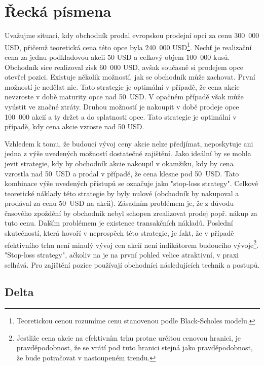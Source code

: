 \documentclass[a4paper]{book}
\begin{document}
\chapter{Řecká písmena}

Uvažujme situaci, kdy obchodník prodal evropskou prodejní opci za cenu 300~000 USD, přičemž teoretická cena této opce byla 240~000 USD\footnote{Teoretickou cenou rozumíme cenu stanovenou podle Black-Scholes modelu.}. Nechť je realizační cena za jednu podkladovou akcii 50 USD a celkový objem 100~000 kusů.
Obchodník sice realizoval zisk 60~000 USD, avšak současně si prodejem opce otevřel pozici.  Existuje několik možností, jak se obchodník může zachovat. První možností je nedělat nic. Tato strategie je optimální v případě, že cena akcie nevzroste v době maturity opce nad 50~USD. V opačném případě však může vyústit ve značné ztráty. Druhou možností je nakoupit v době prodeje opce 100~000 akcií a ty držet a do splatnosti opce. Tato strategie je optimální v případě, kdy cena akcie vzroste nad 50 USD.

Vzhledem k tomu, že budoucí vývoj ceny akcie nelze předjímat, neposkytuje ani jedna z výše uvedených možností dostatečné zajištění. Jako ideální by se mohla jevit strategie, kdy by obchodník akcie nakoupil v okamžiku, kdy by cena vzrostla nad 50~USD a prodal v případě, že cena klesne pod 50~USD. Tato kombinace výše uvedených přístupů se označuje jako "stop-loss strategy". Celkové teoretické náklady této strategie by byly nulové (obchodník by nakupoval a prodával za cenu 50~USD na akcii). Zásadním problémem je, že z důvodu časového zpoždění by obchodník nebyl schopen zrealizovat prodej popř. nákup za tuto cenu. Dalším problémem je existence transakčních nákladů. Poslední skutečností, která hovoří v neprospěch této strategie, je fakt, že v případě efektivního trhu není minulý vývoj cen akcií není indikátorem budoucího vývoje\footnote{Jestliže cena akcie na efektivním trhu protne určitou cenovou hranici, je pravděpodobnost, že se vrátí pod tuto hranici stejná jako pravděpodobnost, že bude potračovat v nastoupeném trendu.}. "Stop-loss strategy", ačkoliv na je na první pohled velice atraktivní, v praxi selhává. Pro zajištění pozice používají obchodníci následujících technik a postupů.

\section{Delta}
\end{document}
